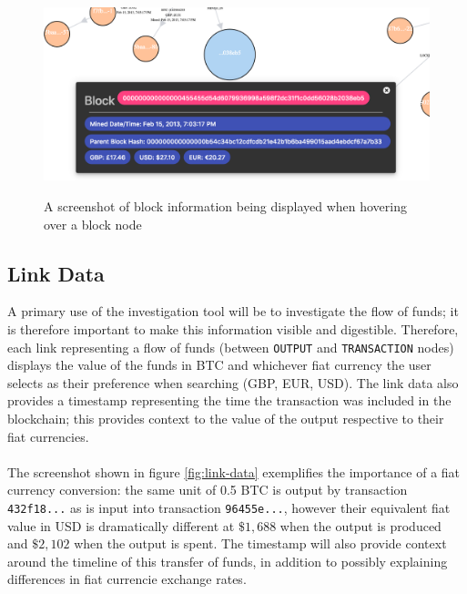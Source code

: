 \begin{figure}[h!]
  \centering
  \includegraphics[width = 15cm]{./figures/ui-screenshots/block-info}\\[0.5cm] 
  \caption{A screenshot of block information being displayed when hovering over a block node}
  \label{fig:block-info-on-hover}
\end{figure}

\subsection{Link Data}
A primary use of the investigation tool will be to investigate the flow of funds; it is therefore important to make this information visible and digestible. Therefore, each link representing a flow of funds (between \texttt{OUTPUT} and \texttt{TRANSACTION} nodes) displays the value of the funds in BTC and whichever fiat currency the user selects as their preference when searching (GBP, EUR, USD). The link data also provides a timestamp representing the time the transaction was included in the blockchain; this provides context to the value of the output respective to their fiat currencies. 
\\\\
The screenshot shown in figure \ref{fig:link-data} exemplifies the importance of a fiat currency conversion: the same unit of 0.5 BTC is output by transaction \texttt{432f18...} as is input into transaction \texttt{96455e...}, however their equivalent fiat value in USD is dramatically different at $\$1,688$ when the output is produced and $\$2,102$ when the output is spent. The timestamp will also provide context around the timeline of this transfer of funds, in addition to possibly explaining differences in fiat currencie exchange rates.

